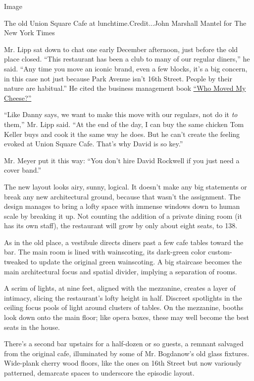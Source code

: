 Image

The old Union Square Cafe at lunchtime.Credit...John Marshall Mantel for
The New York Times

Mr. Lipp sat down to chat one early December afternoon, just before the
old place closed. ``This restaurant has been a club to many of our
regular diners,'' he said. ``Any time you move an iconic brand, even a
few blocks, it's a big concern, in this case not just because Park
Avenue isn't 16th Street. People by their nature are habitual.'' He
cited the business management book
\href{http://www.penguin.com/book/who-moved-my-cheese-by-spencer-johnson/9780399147241}{``Who
Moved My Cheese?''}

``Like Danny says, we want to make this move with our regulars, not do
it \emph{to} them,'' Mr. Lipp said. ``At the end of the day, I can buy
the same chicken Tom Keller buys and cook it the same way he does. But
he can't create the feeling evoked at Union Square Cafe. That's why
David is so key.''

Mr. Meyer put it this way: ``You don't hire David Rockwell if you just
need a cover band.''

The new layout looks airy, sunny, logical. It doesn't make any big
statements or break any new architectural ground, because that wasn't
the assignment. The design manages to bring a lofty space with immense
windows down to human scale by breaking it up. Not counting the addition
of a private dining room (it has its own staff), the restaurant will
grow by only about eight seats, to 138.

As in the old place, a vestibule directs diners past a few cafe tables
toward the bar. The main room is lined with wainscoting, its dark-green
color custom-tweaked to update the original green wainscoting. A big
staircase becomes the main architectural focus and spatial divider,
implying a separation of rooms.

A scrim of lights, at nine feet, aligned with the mezzanine, creates a
layer of intimacy, slicing the restaurant's lofty height in half.
Discreet spotlights in the ceiling focus pools of light around clusters
of tables. On the mezzanine, booths look down onto the main floor; like
opera boxes, these may well become the best seats in the house.

There's a second bar upstairs for a half-dozen or so guests, a remnant
salvaged from the original cafe, illuminated by some of Mr. Bogdanow's
old glass fixtures. Wide-plank cherry wood floors, like the ones on 16th
Street but now variously patterned, demarcate spaces to underscore the
episodic layout.

